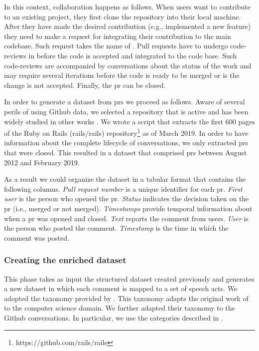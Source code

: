 In this context, collaboration happens as follows. When users want to contribute to an existing project, they first clone the repository into their local machine. After they have made the desired contribution (e.g., implemented a new feature) they need to make a request for integrating their contribution to the main codebase. Such request takes the name of . Pull requests have to undergo code-reviews in before the code is accepted and integrated to the code base. Such code-reviews are accompanied by conversations about the status of the work and may require several iterations before the code is ready to be merged or is the change is not accepted. Finally, the \gls{pr} can be closed. 

In order to generate a dataset from \glspl{pr} we proceed as follows. Aware of several perils \citep{DBLP:journals/ese/KalliamvakouGBS16} of using Github data, we selected a repository that is active and has been widely studied in other works \citep{Zhang2016,Lindberg2016,DBLP:conf/wcre/ConstantinouM17}. We wrote a script that extracts the first 600 pages of the Ruby on Rails (rails/rails) repository\footnote{https://github.com/rails/rails} as of March 2019. 
In order to have information about the complete lifecycle of conversations, we only extracted \glspl{pr} that were closed. This resulted in a dataset that comprised \glspl{pr} between August 2012 and February 2019. 

As a result we could organize the dataset in a tabular format that contains the following columns. \emph{Pull request number} is a unique identifier for each \gls{pr}. \emph{First user} is the person who opened the \gls{pr}. \emph{Status} indicates the decision taken on the \gls{pr} (i.e., merged or not merged). \emph{Timestamps} provide temporal information about when a \gls{pr} was opened and closed. \emph{Text} reports the comment from users. \emph{User} is the person who posted the comment. \emph{Timestamp} is the time in which the comment was posted. 


\subsubsection{Creating the enriched dataset}

This phase takes as input the structured dataset created previously and generates a new dataset in which each comment is mapped to a set of speech acts. 
We adopted the taxonomy provided by \cite{DBLP:journals/cscw/RipocheS06}. This taxonomy adapts the original work of \cite{searle1985expression} to the computer science domain. We further adapted their taxonomy to the Github conversations. In particular, we use the categories described in . 

